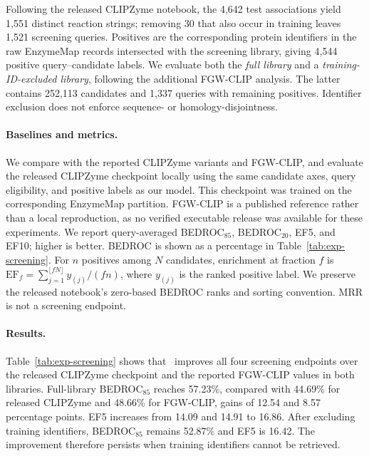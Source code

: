 Following the released CLIPZyme notebook, the 4,642 test associations yield
1,551 distinct reaction strings; removing 30 that also occur in training
leaves 1,521 screening queries. Positives are the corresponding protein
identifiers in the raw EnzymeMap records intersected with the screening
library, giving 4,544 positive query--candidate labels. We evaluate both the
\emph{full library} and a \emph{training-ID-excluded library}, following the
additional FGW-CLIP analysis. The latter contains 252,113 candidates and
1,337 queries with remaining positives. Identifier exclusion does not enforce
sequence- or homology-disjointness.

\paragraph{Baselines and metrics.}
We compare with the reported CLIPZyme variants and FGW-CLIP, and evaluate
the released CLIPZyme checkpoint locally using the same candidate axes,
query eligibility, and positive labels as our model. This checkpoint was
trained on the corresponding EnzymeMap partition. FGW-CLIP is a published
reference rather than a local reproduction, as no verified executable
release was available for these experiments. We report query-averaged
BEDROC$_{85}$, BEDROC$_{20}$, EF5, and EF10; higher is better. BEDROC is shown
as a percentage in Table~\ref{tab:exp-screening}. For $n$ positives among $N$ candidates, enrichment
at fraction $f$ is $\mathrm{EF}_f=\sum_{j=1}^{\lfloor fN\rfloor}y_{(j)}/(fn)$,
where $y_{(j)}$ is the ranked positive label. We preserve the released
notebook's zero-based BEDROC ranks and sorting convention. MRR is not a
screening endpoint.

\begin{table}[t]
\centering\small
\caption{EnzymeMap screening. BEDROC values are percentages; EF values are
fold enrichments. $\dagger$ denotes published results from FGW-CLIP;
CLIPZyme (released) is evaluated locally. The full and excluded libraries
contain 261,907 and 252,113 candidates, respectively. Bold marks the best
locally evaluated result in each column.}
\label{tab:exp-screening}

\end{table}

\paragraph{Results.}
Table~\ref{tab:exp-screening} shows that \methodname\ improves all four
screening endpoints over the released CLIPZyme checkpoint and the reported
FGW-CLIP values in both libraries. Full-library BEDROC$_{85}$ reaches
57.23\%, compared with 44.69\% for released CLIPZyme and 48.66\% for
FGW-CLIP, gains of 12.54 and 8.57 percentage points. EF5 increases from
14.09 and 14.91 to 16.86. After excluding training identifiers,
BEDROC$_{85}$ remains 52.87\% and EF5 is 16.42. The improvement therefore
persists when training identifiers cannot be retrieved.


